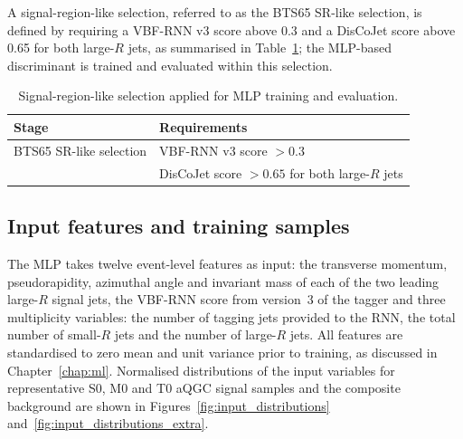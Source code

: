 A signal-region-like selection, referred to as the BTS65 SR-like selection, is defined by requiring a VBF-RNN v3 score above 0.3 and a DisCoJet score above 0.65 for both large-$R$ jets, as summarised in Table~\ref{tab:mlp_selection}; the MLP-based discriminant is trained and evaluated within this selection.

\begin{table}[h]
\centering
\caption{Signal-region-like selection applied for MLP training and evaluation.}
\label{tab:mlp_selection}
\begin{tabular}{ll}
\toprule
Stage & Requirements \\
\midrule
BTS65 SR-like selection
& VBF-RNN v3 score $> 0.3$ \\
& DisCoJet score $> 0.65$ for both large-$R$ jets \\
\bottomrule
\end{tabular}
\end{table}

\subsection{Input features and training samples}

The MLP takes twelve event-level features as input: the transverse momentum, pseudorapidity, azimuthal angle and invariant mass of each of the two leading large-$R$ signal jets, the VBF-RNN score from version~3 of the tagger and three multiplicity variables: the number of tagging jets provided to the RNN, the total number of small-$R$ jets and the number of large-$R$ jets. All features are standardised to zero mean and unit variance prior to training, as discussed in Chapter~\ref{chap:ml}. Normalised distributions of the input variables for representative S0, M0 and T0 aQGC signal samples and the composite background are shown in Figures~\ref{fig:input_distributions} and~\ref{fig:input_distributions_extra}.

